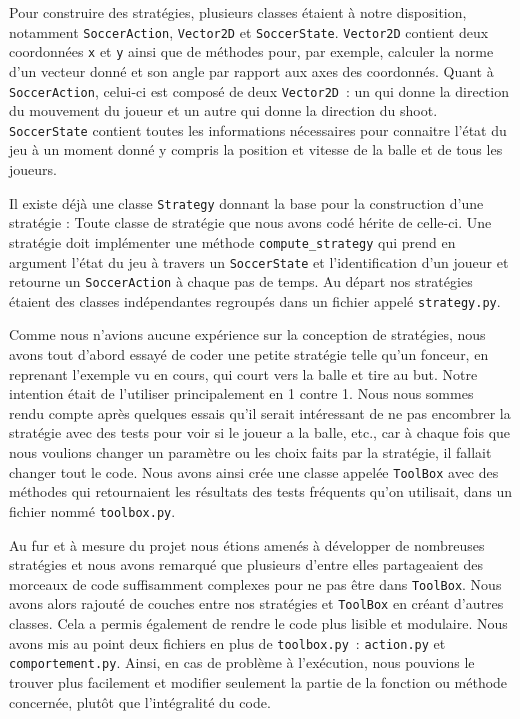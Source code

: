\documentclass[a4paper,12pt]{article}
\numberwithin{equation}{section}
\begin{document}
Pour construire des stratégies, plusieurs classes étaient à notre disposition, notamment \texttt{SoccerAction}, \texttt{Vector2D} et \texttt{SoccerState}. \texttt{Vector2D} contient deux coordonnées \texttt{x} et \texttt{y} ainsi que de méthodes pour, par exemple, calculer la norme d’un vecteur donné et son angle par rapport aux axes des coordonnés. Quant à \texttt{SoccerAction}, celui-ci est composé de deux \texttt{Vector2D} : un qui donne la direction du mouvement du joueur et un autre qui donne la direction du shoot. \texttt{SoccerState} contient toutes les informations nécessaires pour connaitre l’état du jeu à un moment donné y compris la position et vitesse de la balle et de tous les joueurs. 

Il existe déjà une classe \texttt{Strategy} donnant la base pour la construction d'une stratégie : Toute classe de stratégie que nous avons codé hérite de celle-ci. Une stratégie doit implémenter une méthode \texttt{compute\_strategy} qui prend en argument l'état du jeu à travers un \texttt{SoccerState} et l'identification d'un joueur et retourne un \texttt{SoccerAction} à chaque pas de temps. Au départ nos stratégies étaient des classes indépendantes regroupés dans un fichier appelé \texttt{strategy.py}.
	
Comme nous n’avions aucune expérience sur la conception de stratégies, nous avons tout d’abord essayé de coder une petite stratégie telle qu’un fonceur, en reprenant l’exemple vu en cours, qui court vers la balle et tire au but. Notre intention était de l’utiliser principalement en 1 contre 1. Nous nous sommes rendu compte après quelques essais qu’il serait intéressant de ne pas encombrer la stratégie avec des tests pour voir si le joueur a la balle, etc., car à chaque fois que nous voulions changer un paramètre ou les choix faits par la stratégie, il fallait changer tout le code. Nous avons ainsi crée une classe appelée \texttt{ToolBox} avec des méthodes qui retournaient les résultats des tests fréquents qu’on utilisait, dans un fichier nommé \texttt{toolbox.py}.

Au fur et à mesure du projet nous étions amenés à développer de nombreuses stratégies et nous avons remarqué que plusieurs d'entre elles partageaient des morceaux de code suffisamment complexes pour ne pas être dans \texttt{ToolBox}. Nous avons alors rajouté de couches entre nos stratégies et \texttt{ToolBox} en créant d'autres classes. Cela a permis également de rendre le code plus lisible et modulaire. Nous avons mis au point deux fichiers en plus de \texttt{toolbox.py} : \texttt{action.py} et \texttt{comportement.py}. Ainsi, en cas de problème à l’exécution, nous pouvions le trouver plus facilement et modifier seulement la partie de la fonction ou méthode concernée, plutôt que l’intégralité du code.
\end{document}
